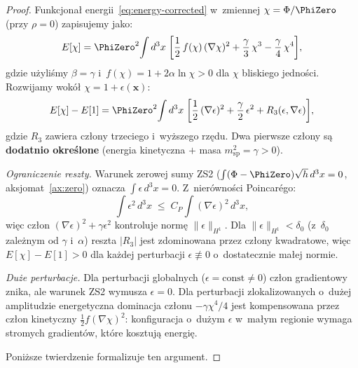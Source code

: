 \begin{proof}
Funkcjona\l{} energii~\eqref{eq:energy-corrected} w~zmiennej
$\chi = \Phi/\PhiZero$ (przy $\rho = 0$) zapisujemy jako:
\begin{equation}\label{eq:E-chi}
  E[\chi] = \PhiZero^2\!\int d^3x\;\biggl[
    \frac{1}{2}\,f(\chi)\,(\nabla\chi)^2
    + \frac{\gamma}{3}\,\chi^3 - \frac{\gamma}{4}\,\chi^4
  \biggr],
\end{equation}
gdzie u\.zyli\'smy $\beta = \gamma$ i~$f(\chi) = 1 + 2\alpha\ln\chi > 0$
dla $\chi$ bliskiego jedno\'sci.
Rozwijamy wok\'o\l{} $\chi = 1 + \epsilon(\mathbf{x})$:
\begin{equation}\label{eq:E-expansion}
  E[\chi] - E[1] = \PhiZero^2\!\int d^3x\;\biggl[
    \frac{1}{2}\,(\nabla\epsilon)^2
    + \frac{\gamma}{2}\,\epsilon^2
    + R_3(\epsilon, \nabla\epsilon)
  \biggr],
\end{equation}
gdzie $R_3$ zawiera cz\l{}ony trzeciego i~wy\.zszego rz\k{e}du.
Dwa pierwsze cz\l{}ony s\k{a} \textbf{dodatnio okre\'slone}
(energia kinetyczna $+$ masa $m_{\mathrm{sp}}^2 = \gamma > 0$).

\smallskip\noindent
\emph{Ograniczenie reszty.}\;
Warunek zerowej sumy ZS2
($\int(\Phi - \PhiZero)\sqrt{h}\,d^3x = 0$,
aksjomat~\ref{ax:zero}) oznacza $\int\epsilon\,d^3x = 0$.
Z~nier\'owno\'sci Poincar\'ego:
\begin{equation}
  \int\epsilon^2\,d^3x \;\leq\; C_P\int(\nabla\epsilon)^2\,d^3x,
\end{equation}
wi\k{e}c cz\l{}on $(\nabla\epsilon)^2 + \gamma\epsilon^2$
kontroluje norm\k{e} $\|\epsilon\|_{H^1}$.
Dla $\|\epsilon\|_{H^1} < \delta_0$ (z~$\delta_0$
zale\.znym od $\gamma$ i~$\alpha$) reszta $|R_3|$ jest
zdominowana przez cz\l{}ony kwadratowe, wi\k{e}c
$E[\chi] - E[1] > 0$ dla ka\.zdej perturbacji
$\epsilon \not\equiv 0$ o~dostatecznie ma\l{}ej normie.

\smallskip\noindent
\emph{Du\.ze perturbacje.}\;
Dla perturbacji globalnych ($\epsilon = \mathrm{const} \neq 0$)
cz\l{}on gradientowy znika, ale warunek ZS2 wymusza
$\epsilon = 0$. Dla perturbacji zlokalizowanych o~du\.zej
amplitudzie energetyczna dominacja cz\l{}onu $-\gamma\chi^4/4$
jest kompensowana przez cz\l{}on kinetyczny $\frac{1}{2}f(\nabla\chi)^2$:
konfiguracja o~du\.zym $\epsilon$ w~ma\l{}ym regionie wymaga
stromych gradient\'ow, kt\'ore kosztuj\k{a} energi\k{e}.

Poni\.zsze twierdzenie formalizuje ten argument.
\end{proof}

